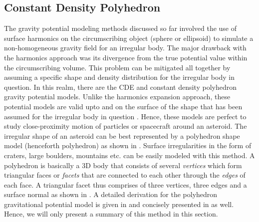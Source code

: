 \subsection{Constant Density Polyhedron}
\label{subsec:polyhedron}
The gravity potential modeling methods discussed so far involved the use of surface harmonics on the circumscribing object (sphere or ellipsoid) to simulate a non-homogeneous gravity field for an irregular body. The major drawback with the harmonics approach was its divergence from the true potential value within the circumscribing volume. This problem can be mitigated all together by assuming a specific shape and density distribution for the irregular body in question. In this realm, there are the \gls{CDE} and constant density polyhedron gravity potential models. Unlike the harmonics expansion approach, these potential models are valid upto and on the surface of the shape that has been assumed for the irregular body in question \parencite{scheeresBook}. Hence, these models are perfect to study close-proximity motion of particles or spacecraft around an asteroid.
%
\newline\newline
%
The irregular shape of an asteroid can be best represented by a polyhedron shape model (henceforth polyhedron) as shown in . Surface irregularities in the form of craters, large boulders, mountains etc. can be easily modeled with this method. A polyhedron is basically a 3D body that consists of several \textit{vertices} which form triangular faces or \textit{facets} that are connected to each other through the \textit{edges} of each face. A triangular facet thus comprises of three vertices, three edges and a surface normal as shown in  \parencite{scheeresBook}. A detailed derivation for the polyhedron gravitational potential model is given in \cite{scheeres_polyhedra} and concisely presented in \cite{scheeresBook} as well. Hence, we will only present a summary of this method in this section.
